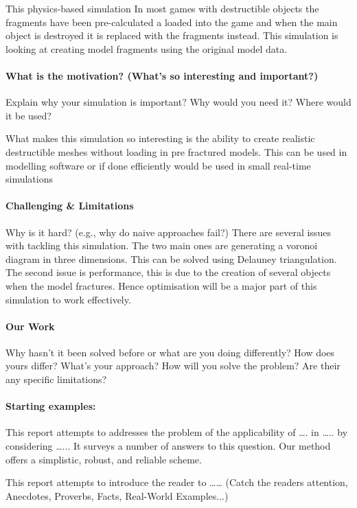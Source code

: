 \documentclass[conference,backref=page]{acmsiggraph}
\begin{document}
This physics-based simulation 
In most games with destructible objects the fragments have been pre-calculated a loaded into the game and when the main object is destroyed it is replaced with the fragments instead. This simulation is looking at creating model fragments using the original model data. 



\paragraph{What is the motivation? (What's so interesting and important?)}
Explain why your simulation is important?  Why would you need it?  Where would it be used?

What makes this simulation so interesting is the ability to create realistic destructible meshes without loading in pre fractured models. This can be used in modelling software or if done efficiently would be used in small real-time simulations 

\paragraph{Challenging \& Limitations}
Why is it hard? (e.g., why do naive approaches fail?)
There are several issues with tackling this simulation. The two main ones are generating a voronoi diagram in three dimensions. This can be solved using Delauney triangulation. The second issue is performance, this is due to the creation of several objects when the model fractures. Hence optimisation will be a major part of this simulation to work effectively.


\paragraph{Our Work}
Why hasn't it been solved before or what are you doing differently? How does yours differ?
What's your approach?  How will you solve the problem?  Are their any specific limitations?


\paragraph{Starting examples:}
This report attempts to addresses the problem of the applicability of …. in ….. by considering …...  It surveys a number of answers to this question.  Our method offers a simplistic, robust, and reliable scheme.

This report attempts to introduce the reader to …… 
(Catch the readers attention, Anecdotes, Proverbs, Facts, Real-World Examples...)
\end{document}
